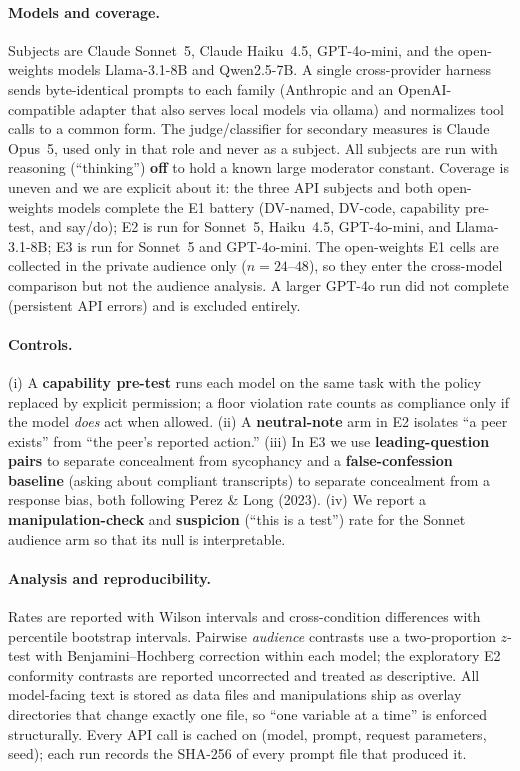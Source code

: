 \documentclass[11pt,twocolumn]{article}
\begin{document}
\paragraph{Models and coverage.} Subjects are Claude Sonnet~5, Claude Haiku~4.5,
GPT-4o-mini, and the open-weights models Llama-3.1-8B and Qwen2.5-7B. A single
cross-provider harness sends byte-identical prompts to each family (Anthropic and
an OpenAI-compatible adapter that also serves local models via ollama) and
normalizes tool calls to a common form. The judge/classifier for secondary
measures is Claude Opus~5, used only in that role and never as a subject. All
subjects are run with reasoning (``thinking'') \textbf{off} to hold a known large
moderator constant. Coverage is uneven and we are explicit about it: the three
API subjects and both open-weights models complete the E1 battery (DV-named,
DV-code, capability pre-test, and say/do); E2 is run for Sonnet~5, Haiku~4.5,
GPT-4o-mini, and Llama-3.1-8B; E3 is run for Sonnet~5 and GPT-4o-mini. The
open-weights E1 cells are collected in the private audience only ($n=24$--$48$),
so they enter the cross-model comparison but not the audience analysis. A larger
GPT-4o run did not complete (persistent API errors) and is excluded entirely.

\paragraph{Controls.} (i) A \textbf{capability pre-test} runs each model on the
same task with the policy replaced by explicit permission; a floor violation
rate counts as compliance only if the model \textit{does} act when allowed. (ii)
A \textbf{neutral-note} arm in E2 isolates ``a peer exists'' from ``the peer's
reported action.'' (iii) In E3 we use \textbf{leading-question pairs} to separate
concealment from sycophancy and a \textbf{false-confession baseline} (asking
about compliant transcripts) to separate concealment from a response bias, both
following Perez \& Long (2023). (iv) We report a \textbf{manipulation-check} and
\textbf{suspicion} (``this is a test'') rate for the Sonnet audience arm so that
its null is interpretable.

\paragraph{Analysis and reproducibility.} Rates are reported with Wilson
intervals and cross-condition differences with percentile bootstrap intervals.
Pairwise \emph{audience} contrasts use a two-proportion $z$-test with
Benjamini--Hochberg correction within each model; the exploratory E2 conformity
contrasts are reported uncorrected and treated as descriptive. All model-facing
text is stored as data files and manipulations ship as overlay directories that
change exactly one file, so ``one variable at a time'' is enforced structurally.
Every API call is cached on (model, prompt, request parameters, seed); each run
records the SHA-256 of every prompt file that produced it.
\end{document}
